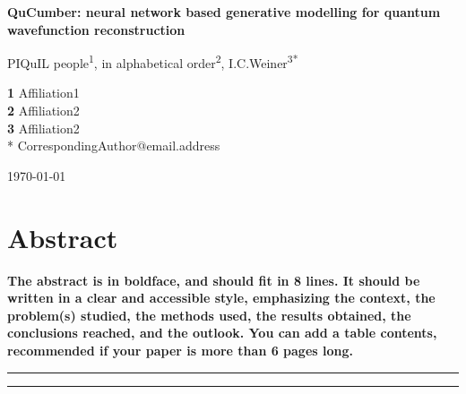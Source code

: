 \documentclass[submission, Phys]{SciPost}
\begin{document}
\begin{center}{\Large \textbf{
QuCumber: neural network based generative modelling for quantum wavefunction reconstruction
}}\end{center}

\begin{center}
PIQuIL people\textsuperscript{1},
in alphabetical order\textsuperscript{2},
I.C.Weiner\textsuperscript{3*}
\end{center}

\begin{center}
{\bf 1} Affiliation1
\\
{\bf 2} Affiliation2
\\
{\bf 3} Affiliation2
\\
* CorrespondingAuthor@email.address
\end{center}

\begin{center}
\today
\end{center}


\section*{Abstract}
{\bf
The abstract is in boldface, and should fit in 8 lines.
It should be written in a clear and accessible style, emphasizing the context, the problem(s) studied, the methods used, the results obtained, the conclusions reached, and the outlook. You can add a table contents, recommended if your paper is more than 6 pages long.
}


\vspace{10pt}
\noindent\rule{\textwidth}{1pt}
\tableofcontents\thispagestyle{fancy}
\noindent\rule{\textwidth}{1pt}
\vspace{10pt}


\end{document}
